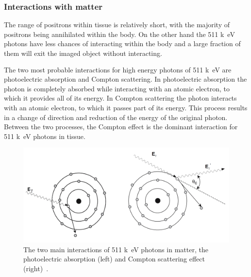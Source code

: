 \begin{table}[htbp]
  \caption{Commonly used radioisotopes and their relevant characteristics for PET imaging.}
\label{tab:radioisotopes}%
\end{table}%

\subsubsection{Interactions with matter}
The range of positrons within tissue is relatively short, with the majority of positrons being annihilated within the body.
On the other hand the 511 \si{k\electronvolt} photons have less chances of interacting within the body and a large fraction of them will exit the imaged object without interacting. 

The two most probable interactions for high energy photons of 511 \si{k\electronvolt} are photoelectric absorption and Compton scattering. In photoelectric absorption the photon is completely absorbed while interacting with an atomic electron, to which it provides all of its energy. In Compton scattering the photon interacts with an atomic electron, to which it passes part of its energy. This process results in a change of direction and reduction of the energy of the original photon. Between the two processes, the Compton effect is the dominant interaction for 511 \si{k\electronvolt} photons in tissue. 
%
\begin{figure} [h!]
\centering
\includegraphics[scale=0.45,angle=0]{2_Theory_Methods/figures/Bailey_gamma_interactions.png}
\caption{The two main interactions of 511 \si{k\electronvolt} photons in matter, the photoelectric absorption (left) and Compton scattering effect (right)~\cite{Bailey2005}.} 
\label{fig_2:511_interactions}
\end{figure} 
%
